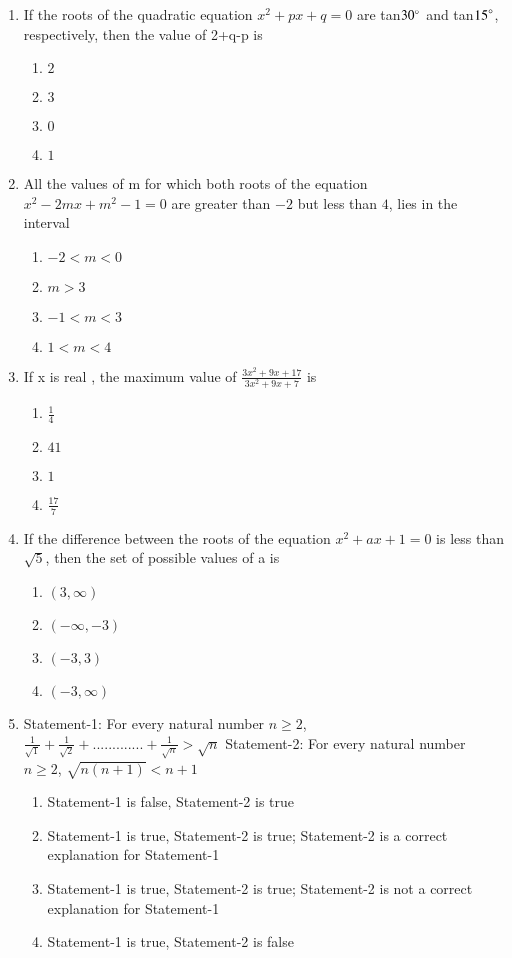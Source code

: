\documentclass[journal,12pt,twocolumn]{IEEEtran}
\begin{document}
\begin{enumerate}[label=\arabic*]
\item If the roots of the quadratic equation $x^2+px+q=0$ are tan$30\degree$ and tan${15}\degree$, respectively, then the value of 2+q-p is
\begin{enumerate}
\item $2$
\item $3$
\item $0$
\item $1$ 
\end{enumerate}

\item All the values of m for which both roots of the equation $x^2-2mx+m^2-1=0$ are greater than $-2$ but less than $4$, lies in the interval
\begin{enumerate}
\item $-2<m<0$
\item $m>3$
\item $-1<m<3$
\item $1<m<4$ 
\end{enumerate}

\item If x is real , the maximum value of $\frac{3x^2+9x+17}{3x^2+9x+7}$ is
\begin{enumerate}
\item $\frac{1}{4}$
\item $41$
\item $1$
\item $\frac{17}{7}$ 
\end{enumerate}

\item If the difference between the roots of the equation $x^2+ax+1=0$ is less than $\sqrt5$, then the set of possible values of a is
\begin{enumerate}
\item $(3,\infty)$
\item $(-\infty,-3)$
\item $(-3,3)$
\item $(-3,\infty)$
\end{enumerate}

\item Statement-1: For every natural number $n\geq{2}$,
$\frac{1}{\sqrt1}+\frac{1}{\sqrt2}+.............+\frac{1}{\sqrt{n}}>\sqrt{n}$ 
Statement-2: For every natural number $n\geq{2}$,
$\sqrt{n(n+1)}<n+1$
\begin{enumerate}
\item Statement-1 is false, Statement-2 is true
\item Statement-1 is true, Statement-2 is true; Statement-2 is a correct explanation for Statement-1
\item Statement-1 is true, Statement-2 is true; Statement-2 is not a correct explanation for Statement-1
\item Statement-1 is true, Statement-2 is false 
\end{enumerate}


\end{enumerate}
\end{document}
